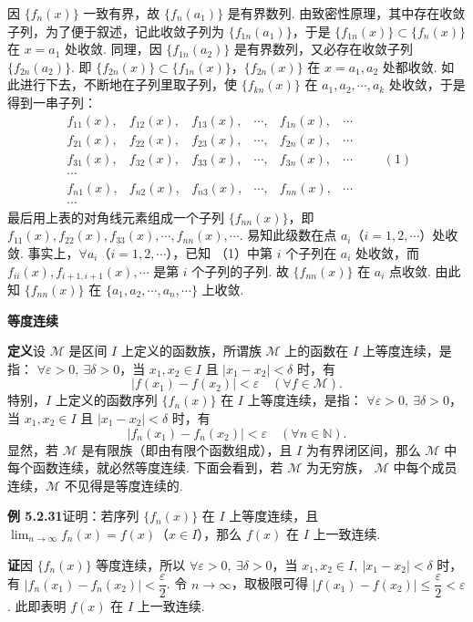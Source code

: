 \documentclass[UTF8, 12pt, fontset=fandol, oneside]{ctexart}
\begin{document}
因 $\{f_n(x)\}$ 一致有界，故 $\{f_n(a_1)\}$ 是有界数列. 由致密性原理，其中存在收敛子列，为了便于叙述，记此收敛子列为
$\{f_{1n}(a_1)\}$，于是 $\{f_{1n}(x)\}\subset\{f_n(x)\}$ 在 $x=a_1$ 处收敛. 同理，因
$\{f_{1n}(a_2)\}$ 是有界数列，又必存在收敛子列 $\{f_{2n}(a_2)\}$. 即
$\{f_{2n}(x)\}\subset\{f_{1n}(x)\}$，$\{f_{2n}(x)\}$ 在 $x=a_1,a_2$ 处都收敛. 如此进行下去，不断地在子列里取子列，使
$\{f_{kn}(x)\}$ 在 $a_1,a_2,\cdots,a_k$ 处收敛，于是得到一串子列：
\[
\begin{matrix}
  f_{11}(x),& f_{12}(x),& f_{13}(x),& \cdots,& f_{1n}(x),& \cdots\\
  f_{21}(x),& f_{22}(x),& f_{23}(x),& \cdots,& f_{2n}(x),& \cdots\\
  f_{31}(x),& f_{32}(x),& f_{33}(x),& \cdots,& f_{3n}(x),& \cdots\\
  \cdots\\
  f_{n1}(x),& f_{n2}(x),& f_{n3}(x),& \cdots,& f_{nn}(x),& \cdots\\
  \cdots
\end{matrix}
\qquad(1)
\]
最后用上表的对角线元素组成一个子列 $\{f_{nn}(x)\}$，即
$f_{11}(x),f_{22}(x),f_{33}(x),\cdots,f_{nn}(x),\cdots$. 易知此级数在点
$a_i$（$i=1,2,\cdots$）处收敛. 事实上，$\forall a_i$（$i=1,2,\cdots$），已知
（1）中第 $i$ 个子列在 $a_i$ 处收敛，而
$f_{ii}(x),f_{i+1,i+1}(x),\cdots$ 是第 $i$ 个子列的子列. 故
$\{f_{nn}(x)\}$ 在 $a_i$ 点收敛. 由此知 $\{f_{nn}(x)\}$ 在
$\{a_1,a_2,\cdots,a_n,\cdots\}$ 上收敛.

\noindent\textbf{等度连续}

\noindent\textbf{定义}\quad 设 $\mathcal M$ 是区间 $I$ 上定义的函数族，所谓族 $\mathcal M$ 上的函数在 $I$ 上等度连续，是指：
$\forall\varepsilon>0,\ \exists\delta>0$，当 $x_1,x_2\in I$ 且
$|x_1-x_2|<\delta$ 时，有
\[
  |f(x_1)-f(x_2)|<\varepsilon\quad(\forall f\in\mathcal M).
\]
特别，$I$ 上定义的函数序列 $\{f_n(x)\}$ 在 $I$ 上等度连续，是指：
$\forall\varepsilon>0,\ \exists\delta>0$，当 $x_1,x_2\in I$ 且
$|x_1-x_2|<\delta$ 时，有
\[
  |f_n(x_1)-f_n(x_2)|<\varepsilon\quad(\forall n\in\mathbb N).
\]
显然，若 $\mathcal M$ 是有限族（即由有限个函数组成），且 $I$ 为有界闭区间，那么
$\mathcal M$ 中每个函数连续，就必然等度连续. 下面会看到，若 $\mathcal M$ 为无穷族，
$\mathcal M$ 中每个成员连续，$\mathcal M$ 不见得是等度连续的.

\noindent\textbf{例 5.2.31}\quad 证明：若序列 $\{f_n(x)\}$ 在 $I$ 上等度连续，且
$\displaystyle\lim_{n\to\infty}f_n(x)=f(x)$（$x\in I$），那么 $f(x)$ 在 $I$ 上一致连续.

\noindent\textbf{证}\quad 因 $\{f_n(x)\}$ 等度连续，所以 $\forall\varepsilon>0,\ \exists\delta>0$，当
$x_1,x_2\in I,\ |x_1-x_2|<\delta$ 时，有
$|f_n(x_1)-f_n(x_2)|<\dfrac\varepsilon2$. 令 $n\to\infty$，取极限可得
$|f(x_1)-f(x_2)|\le\dfrac\varepsilon2<\varepsilon$. 此即表明 $f(x)$ 在 $I$ 上一致连续.
\end{document}
